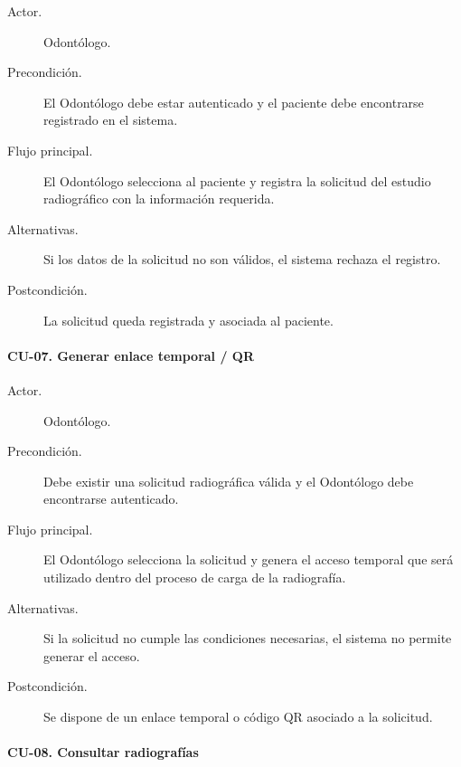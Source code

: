 \begin{description}
	
	\item[Actor.] Odontólogo.
	
	\item[Precondición.] El Odontólogo debe estar autenticado y el paciente debe
	encontrarse registrado en el sistema.
	
	\item[Flujo principal.] El Odontólogo selecciona al paciente y registra la
	solicitud del estudio radiográfico con la información requerida.
	
	\item[Alternativas.] Si los datos de la solicitud no son válidos, el sistema
	rechaza el registro.
	
	\item[Postcondición.] La solicitud queda registrada y asociada al paciente.
	
\end{description}


\paragraph{CU-07. Generar enlace temporal / QR}

\begin{description}
	
	\item[Actor.] Odontólogo.
	
	\item[Precondición.] Debe existir una solicitud radiográfica válida y el
	Odontólogo debe encontrarse autenticado.
	
	\item[Flujo principal.] El Odontólogo selecciona la solicitud y genera el
	acceso temporal que será utilizado dentro del proceso de carga de la
	radiografía.
	
	\item[Alternativas.] Si la solicitud no cumple las condiciones necesarias,
	el sistema no permite generar el acceso.
	
	\item[Postcondición.] Se dispone de un enlace temporal o código QR asociado
	a la solicitud.
	
\end{description}


\paragraph{CU-08. Consultar radiografías}

